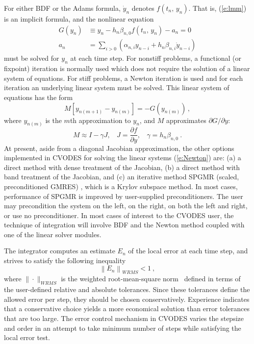 For either BDF or the Adams formula, $\dot{y}_n$ denotes
$f(t_n,\,y_n)$. That is, (\ref{e:lmm}) is an implicit formula, and 
the nonlinear equation 
\begin{equation}\label{e:nonlinear}
  \begin{split}
    G(y_n) &\equiv  y_n-h_n\beta_{n,0}f(t_n,\,y_n) - a_n=0   \\
    a_n &= \sum_{i>0}(\alpha_{n,i}y_{n-i}+h_n\beta_{n,i}\dot{y}_{n-i}) 
  \end{split}
\end{equation}
must be solved for $y_{n}$ at each time step. For nonstiff problems,
a functional (or fixpoint) iteration is normally used which does not
require the solution of a linear system of equations. For stiff
problems, a Newton iteration is used and for each iteration an
underlying linear system must be solved. This linear system of
equations has the form
\begin{equation}\label{e:Newton}
M[y_{n(m+1)}-y_{n(m)}]=-G(y_{n(m)}) \, ,
\end{equation}
where $y_{n(m)}$ is the $m$th approximation to $y_n$, and $M$
approximates $\partial G/ \partial y$:
\begin{equation} \label{e:N_Matrix}
M \approx I-\gamma J, ~~~~ J = \frac{\partial f}{\partial y}, ~~~~
    \gamma = h_n\beta_{n,0} ~.
\end{equation}
At present, aside from a diagonal Jacobian approximation, the other
options implemented in CVODES for solving the linear systems
(\ref{e:Newton}) are:
(a) a direct method with dense treatment of the Jacobian,
(b) a direct method with band treatment of the Jacobian, and
(c) an iterative method SPGMR (scaled, preconditioned
GMRES) \cite{BrHi:89}, which is a Krylov subspace method. In most
cases, performance of SPGMR is improved by user-supplied
preconditioners. The user may precondition the system on the left, on
the right, on both the left and right, or use no preconditioner.
In most cases of interest to the CVODES user, the technique of
integration will involve BDF and the Newton method coupled with one of the 
linear solver modules.

The integrator computes an estimate $E_{n}$ of the local error at each time
step, and strives to satisfy the following inequality
\begin{equation*}
\left\| E_n\right\|_{WRMS} < 1 ~,
\end{equation*}
where $\|\cdot\|_{WRMS}$ is the weighted root-mean-square norm~\cite{BCP:96}
defined in terms of the user-defined relative and absolute tolerances. 
Since these tolerances define the allowed error per step, they should be 
chosen conservatively. Experience indicates that a conservative choice yields 
a more economical solution than error tolerances that are too large.
The error control mechanism in CVODES varies the stepsize and order
in an attempt to take minimum number of steps while satisfying the local
error test. 

